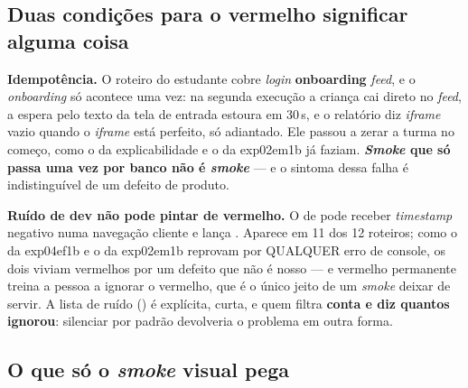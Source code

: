 \subsection{Duas condições para o vermelho significar alguma coisa}

\textbf{Idempotência.} O roteiro do estudante cobre \emph{login} \seta{}
\textbf{onboarding} \seta{} \emph{feed}, e o \emph{onboarding} só acontece uma
vez: na segunda execução a criança cai direto no \emph{feed}, a espera pelo
texto da tela de entrada estoura em 30\,s, e o relatório diz \emph{iframe}
vazio quando o \emph{iframe} está perfeito, só adiantado. Ele passou a zerar a
turma no começo, como o da explicabilidade e o da exp02em1b já faziam.
\textbf{\emph{Smoke} que só passa uma vez por banco não é \emph{smoke}} --- e o
sintoma dessa falha é indistinguível de um defeito de produto.

\textbf{Ruído de dev não pode pintar de vermelho.} O
 de
 pode receber \emph{timestamp} negativo numa
navegação cliente e lança .
Aparece em 11 dos 12 roteiros; como o da exp04ef1b e o da exp02em1b reprovam por
QUALQUER erro de console, os dois viviam vermelhos por um defeito que não é
nosso --- e vermelho permanente treina a pessoa a ignorar o vermelho, que é o
único jeito de um \emph{smoke} deixar de servir. A lista de ruído
() é explícita, curta, e quem filtra \textbf{conta e diz
quantos ignorou}: silenciar por padrão devolveria o problema em outra forma.

\subsection{O que só o \emph{smoke} visual pega}

